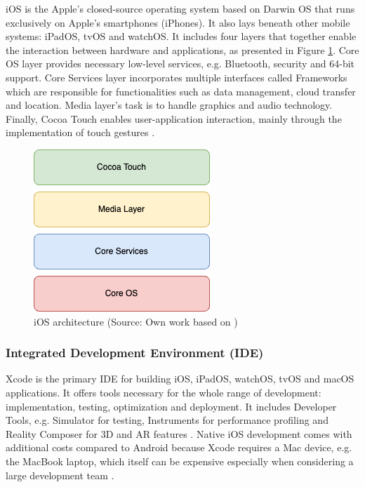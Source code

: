 iOS is the Apple's closed-source operating system based on Darwin OS that runs exclusively on Apple's smartphones (iPhones). It also lays beneath other mobile systems: iPadOS, tvOS and watchOS. It includes four layers that together enable the interaction between hardware and applications, as presented in Figure \ref{fig:ios_architecture}. Core OS layer provides necessary low-level services, e.g. Bluetooth, security and 64-bit support. Core Services layer incorporates multiple interfaces called Frameworks which are responsible for functionalities such as data management, cloud transfer and location. Media layer's task is to handle graphics and audio technology. Finally, Cocoa Touch enables user-application interaction, mainly through the implementation of touch gestures \cite{ios_architecture,mobile_os_survey}.

\begin{figure}[h]
  \centering
  \includegraphics[scale=0.73]{img/ios_architecture}
  \caption{iOS architecture (Source: Own work based on \cite{ios_architecture})}
  \label{fig:ios_architecture}
\end{figure}

\subsubsection*{Integrated Development Environment (IDE)}

Xcode is the primary IDE for building iOS, iPadOS, watchOS, tvOS and macOS applications. It offers tools necessary for the whole range of development: implementation, testing, optimization and deployment. It includes Developer Tools, e.g. Simulator for testing, Instruments for performance profiling and Reality Composer for 3D and AR features \cite{xcode_documentation}. Native iOS development comes with additional costs compared to Android because Xcode requires a Mac device, e.g. the MacBook laptop, which itself can be expensive especially when considering a large development team \cite{comparison_technologies_multiplatform,comp_study_hybrid}.

